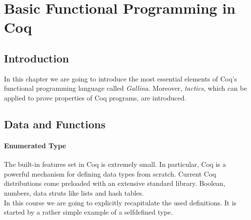\section{Basic Functional Programming in Coq}

	\subsection{Introduction}

	In this chapter we are going to introduce the most essential elements of Coq's functional programming language called {\itshape Gallina}. 
	Moreover, {\itshape tactics}, which can be applied to prove properties of Coq programs, are introduced.
	
	\subsection{Data and Functions}
	\label{subSec:DataAndFuctions}
	
	 \paragraph{Enumerated Type}
	 
	 
	  The built-in features set in Coq is extremely small. In particular, Coq is a powerful mechanism for defining data types from scratch.
	  Current Coq distributions come preloaded with an extensive standard library.
	  Boolean, numbers, data struts like lists and hash tables.\\
	  
	  In this course we are going to explicitly recapitulate the used definitions. 
	  It is started by a rather simple example of a selfdefined type.  
	   
